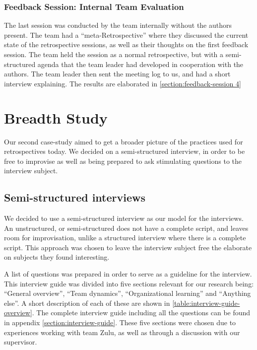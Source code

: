 \subsubsection{Feedback Session: Internal Team Evaluation}
The last session was conducted by the team internally without the authors present. The team had a ``meta-Retrospective'' where they discussed the current state of the retrospective sessions, as well as their thoughts on the first feedback session. The team held the session as a normal retrospective, but with a semi-structured agenda that the team leader had developed in cooperation with the authors. The team leader then sent the meeting log to us, and had a short interview explaining. The results are elaborated in \autoref{section:feedback-session 4}

\section{Breadth Study}
Our second case-study aimed to get a broader picture of the practices used for retrospectives today. We decided on a semi-structured interview, in order to be free to improvise as well as being prepared to ask stimulating questions to the interview subject.

\subsection{Semi-structured interviews}
We decided to use a semi-structured interview as our model for the interviews. An unstructured, or semi-structured does not have a complete script, and leaves room for improvisation, unlike a structured interview where there is a complete script. \cite{Myers2007} This approach was chosen to leave the interview subject free the elaborate on subjects they found interesting. 

A list of questions was prepared in order to serve as a guideline for the interview. This interview guide was divided into five sections relevant for our research being: ``General overview'', ``Team dynamics'', ``Organizational learning'' and ``Anything else''. A short description of each of these are shown in \autoref{table:interview-guide-overview}. The complete interview guide including all the questions can be found in appendix \autoref{section:interview-guide}. These five sections were chosen due to experiences working with team Zulu, as well as through a discussion with our supervisor. 

